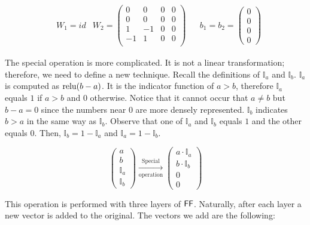 \begin{align*}
    & W_1 = id
    & W_2  = \left(\begin{matrix}
        0   & 0   & 0   & 0 \\   
        0   & 0   & 0   & 0 \\
        1   & -1  & 0   & 0 \\
        -1  & 1   & 0   & 0 \\
    \end{matrix}\right) &
    & b_1 = b_2 = \left(\begin{matrix}
        0 \\
        0 \\
        0 \\
        0
    \end{matrix}\right) 
\end{align*}


\bigskip

The special operation is more complicated.
It is not a linear transformation; therefore, we need to define a new technique.
Recall the definitions of $\mathbb{I}_a$ and $\mathbb{I}_b$.
$\mathbb{I}_a$ is computed as $\mathrm{relu}(b-a)$. 
It is the indicator function of $a>b$, therefore $\mathbb{I}_a$ equals $1$ if $a>b$ and $0$ otherwise.
Notice that it cannot occur that $a \neq b$ but $b-a = 0$ since the numbers near $0$ are more densely represented.
$\mathbb{I}_b$ indicates $b>a$ in the same way as $\mathbb{I}_b$.
Observe that one of $\mathbb{I}_a$ and $\mathbb{I}_b$ equals $1$ and the other equals $0$.
Then, $\mathbb{I}_b = 1 - \mathbb{I}_a$ and $\mathbb{I}_a = 1 - \mathbb{I}_b$.



\begin{equation*}
    \left(\begin{matrix}
        a \\ b \\ \mathbb{I}_a \\ \mathbb{I}_b
    \end{matrix}\right)
    \xrightarrow[\text{operation}]{\text{Special}}
    \left(\begin{matrix}
        a \cdot \mathbb{I}_a \\ b \cdot \mathbb{I}_b\\ 0 \\ 0
    \end{matrix}\right)
\end{equation*}

This operation is performed with three layers of $\mathsf{FF}$.
Naturally, after each layer a new vector is added to the original.
The vectors we add are the following:

